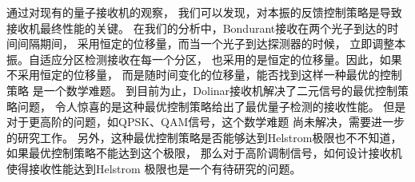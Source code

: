 通过对现有的量子接收机的观察，
我们可以发现，对本振的反馈控制策略是导致接收机最终性能的关键。
在我们的分析中，Bondurant接收在两个光子到达的时间间隔期间，
采用恒定的位移量，而当一个光子到达探测器的时候，
立即调整本振。自适应分区检测接收在每一个分区，
也采用的是恒定的位移量。因此，如果不采用恒定的位移量，
而是随时间变化的位移量，能否找到这样一种最优的控制策略
是一个数学难题。
到目前为止，Dolinar接收机解决了二元信号的最优控制策略问题，
令人惊喜的是这种最优控制策略给出了最优量子检测的接收性能。
但是对于更高阶的问题，如QPSK、QAM信号，这个数学难题
尚未解决，需要进一步的研究工作。
另外，这种最优控制策略是否能够达到Helstrom极限也不不知道，
如果最优控制策略不能达到这个极限，
那么对于高阶调制信号，如何设计接收机使得接收性能达到Helstrom
极限也是一个有待研究的问题。
